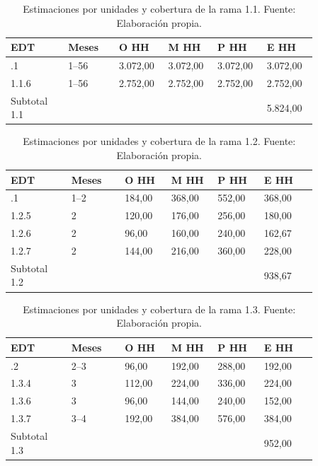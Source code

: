 \documentclass[11pt]{article}
\begin{document}
\begingroup
\small
\begin{longtable}{@{}p{0.17\linewidth}p{0.15\linewidth}p{0.13\linewidth}p{0.13\linewidth}p{0.13\linewidth}p{0.15\linewidth}@{}}
\caption[Estimaciones por unidades y cobertura de la rama 1.1]{Estimaciones por unidades y cobertura de la rama 1.1. Fuente: Elaboración propia.}\label{tab:t15-tareas-1}\\
\toprule
\textbf{EDT} & \textbf{Meses} & \textbf{O HH} & \textbf{M HH} & \textbf{P HH} & \textbf{E HH} \\
\midrule
\endhead
\bottomrule
\endlastfoot
1.1.1 & 1--56 & 3.072,00 & 3.072,00 & 3.072,00 & 3.072,00 \\
1.1.6 & 1--56 & 2.752,00 & 2.752,00 & 2.752,00 & 2.752,00 \\
Subtotal 1.1 &  &  &  &  & 5.824,00 \\
\end{longtable}
\endgroup



\begingroup
\small
\begin{longtable}{@{}p{0.17\linewidth}p{0.15\linewidth}p{0.13\linewidth}p{0.13\linewidth}p{0.13\linewidth}p{0.15\linewidth}@{}}
\caption[Estimaciones por unidades y cobertura de la rama 1.2]{Estimaciones por unidades y cobertura de la rama 1.2. Fuente: Elaboración propia.}\label{tab:t15-tareas-2}\\
\toprule
\textbf{EDT} & \textbf{Meses} & \textbf{O HH} & \textbf{M HH} & \textbf{P HH} & \textbf{E HH} \\
\midrule
\endhead
\bottomrule
\endlastfoot
1.2.1 & 1--2 & 184,00 & 368,00 & 552,00 & 368,00 \\
1.2.5 & 2 & 120,00 & 176,00 & 256,00 & 180,00 \\
1.2.6 & 2 & 96,00 & 160,00 & 240,00 & 162,67 \\
1.2.7 & 2 & 144,00 & 216,00 & 360,00 & 228,00 \\
Subtotal 1.2 &  &  &  &  & 938,67 \\
\end{longtable}
\endgroup



\begingroup
\small
\begin{longtable}{@{}p{0.17\linewidth}p{0.15\linewidth}p{0.13\linewidth}p{0.13\linewidth}p{0.13\linewidth}p{0.15\linewidth}@{}}
\caption[Estimaciones por unidades y cobertura de la rama 1.3]{Estimaciones por unidades y cobertura de la rama 1.3. Fuente: Elaboración propia.}\label{tab:t15-tareas-3}\\
\toprule
\textbf{EDT} & \textbf{Meses} & \textbf{O HH} & \textbf{M HH} & \textbf{P HH} & \textbf{E HH} \\
\midrule
\endhead
\bottomrule
\endlastfoot
1.3.2 & 2--3 & 96,00 & 192,00 & 288,00 & 192,00 \\
1.3.4 & 3 & 112,00 & 224,00 & 336,00 & 224,00 \\
1.3.6 & 3 & 96,00 & 144,00 & 240,00 & 152,00 \\
1.3.7 & 3--4 & 192,00 & 384,00 & 576,00 & 384,00 \\
Subtotal 1.3 &  &  &  &  & 952,00 \\
\end{longtable}
\endgroup
\end{document}
